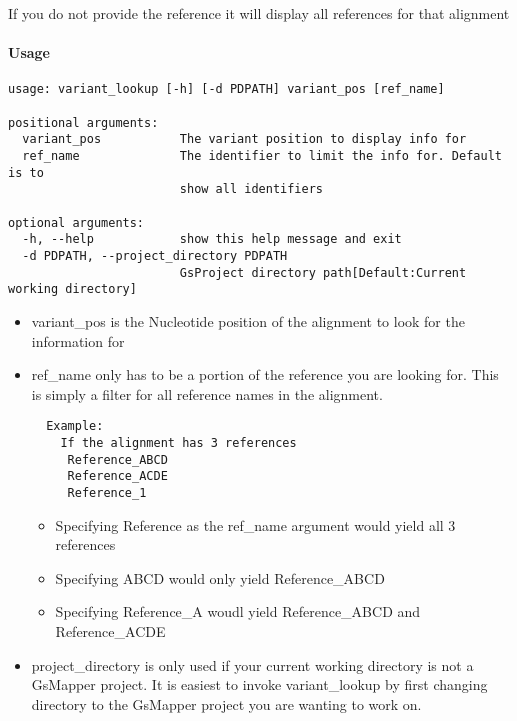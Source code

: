 \documentclass{article}
\begin{document}
If you do not provide the reference it will display all references for that alignment

\paragraph{Usage}

\begin{lstlisting}
usage: variant_lookup [-h] [-d PDPATH] variant_pos [ref_name]

positional arguments:
  variant_pos           The variant position to display info for
  ref_name              The identifier to limit the info for. Default is to
                        show all identifiers

optional arguments:
  -h, --help            show this help message and exit
  -d PDPATH, --project_directory PDPATH
                        GsProject directory path[Default:Current working directory]
\end{lstlisting}
\begin{itemize}
 \item variant\_pos is the Nucleotide position of the alignment to look for the information for
 \item ref\_name only has to be a portion of the reference you are looking for. This is simply a filter for all reference names in the alignment.
 \begin{verbatim}
  Example:
    If the alignment has 3 references
     Reference_ABCD
     Reference_ACDE
     Reference_1
 \end{verbatim}
 \begin{itemize}
   \item Specifying Reference as the ref\_name argument would yield all 3 references
   \item Specifying ABCD would only yield Reference\_ABCD
   \item Specifying Reference\_A woudl yield Reference\_ABCD and Reference\_ACDE
 \end{itemize}
 \item project\_directory is only used if your current working directory is not a GsMapper project. It is easiest to invoke variant\_lookup by first changing directory to the GsMapper project you are wanting to work on.
\end{itemize}
\end{document}
